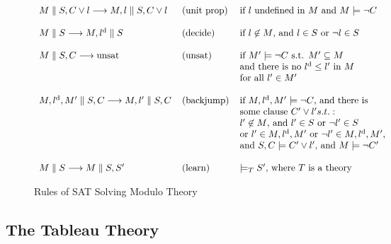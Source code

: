 \begin{figure}[t]
\parbox{\textwidth}
{\small
\begin{center}
$\begin{array}{l@{\hspace{0.4cm}}l@{\hspace{0.4cm}}l}
M\parallel{}S,C\lor{}l\longrightarrow{}M,l\parallel{}S,C\lor{}l &
  (\mathrm{unit~prop}) & \mbox{if }l\mbox{ undefined in }{}M\mbox{ and }M\models{}\neg{}C\\\\

M\parallel{}S\longrightarrow{}M,l^\mathrm{d}\parallel{}S & (\mathrm{decide}) &
\mbox{if }l\not\in{}M\mbox{, and }l\in{}S\mbox{ or }\neg{}l\in{}S\\\\

M\parallel{}S,C\longrightarrow\mathrm{unsat} & (\mathrm{unsat}) &
\mbox{if }M'\models{}\neg{}C\mbox{ s.t. }M'\subseteq{}M\\
&& \mbox{and there is no }l^\mathrm{d}\leq{}l'\mbox{ in }M\\
&& \mbox{for all }l'\in{}M'\\\\
 
M,l^\mathrm{d},M'\parallel{}S,C\longrightarrow{}M,l'\parallel{}S,C &
(\mathrm{backjump}) & \mbox{if }M,l^\mathrm{d},M'\models\neg{}C
\mbox{, and there is}\\
&& \mbox{some clause }C'\lor{}l' s.t.:\\
&& l'\not\in{}M\mbox{, and }l'\in{}S\mbox{ or }\neg{}l'\in{}S\\
&& \mbox{or }l'\in{}M,l^\mathrm{d},M'\mbox{ or }
\neg{}l'\in{}M,l^\mathrm{d},M',\\
&& \mbox{and }S,C\models{}C'\lor{}l'\mbox{, and }M\models\neg{}C'\\\\

M\parallel{}S\longrightarrow{}M\parallel{}S,S'
& (\mathrm{learn}) & \models_TS'\mbox{, where }T\mbox{ is a theory}
\end{array}$
\end{center}}
\caption{Rules of SAT Solving Modulo Theory}
\label{fig:smt}
\end{figure}

\subsection{The Tableau Theory}
\label{sec:tab}

